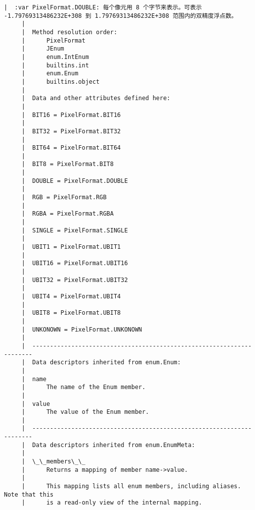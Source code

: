 \documentclass[11pt]{article}
\begin{document}
\begin{Verbatim}[commandchars=\\\{\}]
     |  :var PixelFormat.DOUBLE: 每个像元用 8 个字节来表示。可表示 -1.79769313486232E+308 到 1.79769313486232E+308 范围内的双精度浮点数。
     |  
     |  Method resolution order:
     |      PixelFormat
     |      JEnum
     |      enum.IntEnum
     |      builtins.int
     |      enum.Enum
     |      builtins.object
     |  
     |  Data and other attributes defined here:
     |  
     |  BIT16 = PixelFormat.BIT16
     |  
     |  BIT32 = PixelFormat.BIT32
     |  
     |  BIT64 = PixelFormat.BIT64
     |  
     |  BIT8 = PixelFormat.BIT8
     |  
     |  DOUBLE = PixelFormat.DOUBLE
     |  
     |  RGB = PixelFormat.RGB
     |  
     |  RGBA = PixelFormat.RGBA
     |  
     |  SINGLE = PixelFormat.SINGLE
     |  
     |  UBIT1 = PixelFormat.UBIT1
     |  
     |  UBIT16 = PixelFormat.UBIT16
     |  
     |  UBIT32 = PixelFormat.UBIT32
     |  
     |  UBIT4 = PixelFormat.UBIT4
     |  
     |  UBIT8 = PixelFormat.UBIT8
     |  
     |  UNKONOWN = PixelFormat.UNKONOWN
     |  
     |  ----------------------------------------------------------------------
     |  Data descriptors inherited from enum.Enum:
     |  
     |  name
     |      The name of the Enum member.
     |  
     |  value
     |      The value of the Enum member.
     |  
     |  ----------------------------------------------------------------------
     |  Data descriptors inherited from enum.EnumMeta:
     |  
     |  \_\_members\_\_
     |      Returns a mapping of member name->value.
     |      
     |      This mapping lists all enum members, including aliases. Note that this
     |      is a read-only view of the internal mapping.
    

\end{Verbatim}
\end{document}
